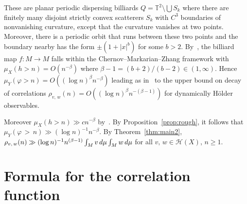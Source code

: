 \documentclass[AHL,Unicode,longabstracts,published]{cedram}
\newcommand{\T}{\mathbb{T}}
\newcommand{\cH}{\mathcal{H}}
\begin{document}
\begin{exam}
These are planar periodic dispersing billiards $Q=\T^2\setminus\bigcup S_k$ where there are finitely many disjoint strictly convex scatterers $S_k$ with $C^3$ boundaries of nonvanishing curvature, except that the curvature vanishes at two points. Moreover, there is a periodic orbit that runs between these two points and the boundary nearby has the form $\pm(1+|x|^b)$ for some $b>2$. By~\cite[Theorem~1]{ChernovZhang05b}, the billiard map $f:M\to M$ falls within the Chernov--Markarian--Zhang framework with $\mu_X(h>n)=O(n^{-\beta})$ where $\beta-1=(b+2)/(b-2)\in (1,\infty)$. Hence $\mu_Y(\varphi>n)=O((\log n)^\beta n^{-\beta})$ leading as in~\cite{Young99} to the upper bound on decay of correlations $\rho_{v,\,w}(n)=O((\log n)^\beta n^{-(\beta-1)})$ for dynamically H\"older observables.

Moreover $\mu_X(h>n)\gg cn^{-\beta}$ by~\cite[Proposition~2]{ChernovZhang05b}. By Proposition~\ref{prop:rough}, it follows that $\mu_Y(\varphi\,>\,n)\gg (\log n)^{-1}n^{-\beta}$. By Theorem~\ref{thm:main2}, $\rho_{v,\,w}(n)\gg (\log n)^{-1}n^{(\beta-1)}\linebreak\int_M v\,d\mu\int_M w\,d\mu$ for all $v,\,w\in \cH(X)$, $n\ge1$.
\end{exam}

\appendix

\section{Formula for the correlation function}\label{app:conv}
\end{document}
